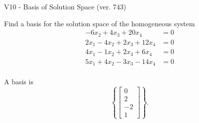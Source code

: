 \begin{exercise}
  \begin{exerciseTitle}V10 - Basis of Solution Space (ver. 743)\end{exerciseTitle}
  \begin{exerciseStatement}
    Find a basis for the solution space of the homogeneous system 
\begin{align*}
 -6 x_ 2 + 4 x_ 3 + 20 x_ 4 &= 0  \\ 
  2 x_ 1 -4 x_ 2 + 2 x_ 3 + 12 x_ 4 &= 0  \\ 
  4 x_ 1 -1 x_ 2 + 2 x_ 3 + 6 x_ 4 &= 0  \\ 
  5 x_ 1 + 4 x_ 2 -3 x_ 3 -14 x_ 4 &= 0  \\ 
 \end{align*}


 
  \end{exerciseStatement}

  \begin{exerciseAnswer}
   A basis is   
\[\left\{\left[\begin{array}{c}
0 \\
2 \\
-2 \\
1
\end{array}\right]\right\}.\]

  


  \end{exerciseAnswer}
\end{exercise}